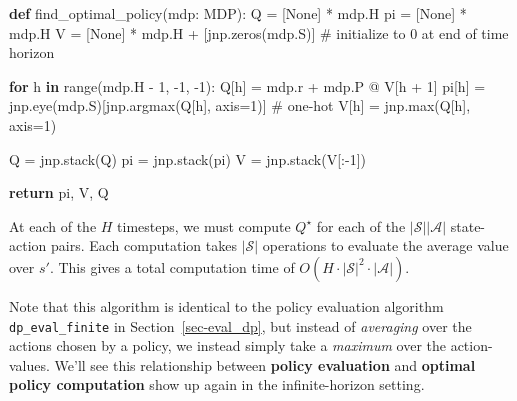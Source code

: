 \documentclass[
  letterpaper,
  DIV=11,
  numbers=noendperiod]{scrreprt}
\newenvironment{Shaded}{\begin{snugshade}}{\end{snugshade}}
\newcommand{\BuiltInTok}[1]{\textcolor[rgb]{0.00,0.23,0.31}{#1}}
\newcommand{\CommentTok}[1]{\textcolor[rgb]{0.37,0.37,0.37}{#1}}
\newcommand{\ControlFlowTok}[1]{\textcolor[rgb]{0.00,0.23,0.31}{\textbf{#1}}}
\newcommand{\DecValTok}[1]{\textcolor[rgb]{0.68,0.00,0.00}{#1}}
\newcommand{\KeywordTok}[1]{\textcolor[rgb]{0.00,0.23,0.31}{\textbf{#1}}}
\newcommand{\NormalTok}[1]{\textcolor[rgb]{0.00,0.23,0.31}{#1}}
\newcommand{\OperatorTok}[1]{\textcolor[rgb]{0.37,0.37,0.37}{#1}}
\newcommand{\VariableTok}[1]{\textcolor[rgb]{0.07,0.07,0.07}{#1}}
\theoremstyle{plain}
\theoremstyle{plain}
\theoremstyle{definition}
\theoremstyle{definition}
\theoremstyle{remark}
\begin{document}
\begin{Shaded}
\begin{Highlighting}[]
\KeywordTok{def}\NormalTok{ find\_optimal\_policy(mdp: MDP):}
\NormalTok{    Q }\OperatorTok{=}\NormalTok{ [}\VariableTok{None}\NormalTok{] }\OperatorTok{*}\NormalTok{ mdp.H}
\NormalTok{    pi }\OperatorTok{=}\NormalTok{ [}\VariableTok{None}\NormalTok{] }\OperatorTok{*}\NormalTok{ mdp.H}
\NormalTok{    V }\OperatorTok{=}\NormalTok{ [}\VariableTok{None}\NormalTok{] }\OperatorTok{*}\NormalTok{ mdp.H }\OperatorTok{+}\NormalTok{ [jnp.zeros(mdp.S)]  }\CommentTok{\# initialize to 0 at end of time horizon}

    \ControlFlowTok{for}\NormalTok{ h }\KeywordTok{in} \BuiltInTok{range}\NormalTok{(mdp.H }\OperatorTok{{-}} \DecValTok{1}\NormalTok{, }\OperatorTok{{-}}\DecValTok{1}\NormalTok{, }\OperatorTok{{-}}\DecValTok{1}\NormalTok{):}
\NormalTok{        Q[h] }\OperatorTok{=}\NormalTok{ mdp.r }\OperatorTok{+}\NormalTok{ mdp.P }\OperatorTok{@}\NormalTok{ V[h }\OperatorTok{+} \DecValTok{1}\NormalTok{]}
\NormalTok{        pi[h] }\OperatorTok{=}\NormalTok{ jnp.eye(mdp.S)[jnp.argmax(Q[h], axis}\OperatorTok{=}\DecValTok{1}\NormalTok{)]  }\CommentTok{\# one{-}hot}
\NormalTok{        V[h] }\OperatorTok{=}\NormalTok{ jnp.}\BuiltInTok{max}\NormalTok{(Q[h], axis}\OperatorTok{=}\DecValTok{1}\NormalTok{)}

\NormalTok{    Q }\OperatorTok{=}\NormalTok{ jnp.stack(Q)}
\NormalTok{    pi }\OperatorTok{=}\NormalTok{ jnp.stack(pi)}
\NormalTok{    V }\OperatorTok{=}\NormalTok{ jnp.stack(V[:}\OperatorTok{{-}}\DecValTok{1}\NormalTok{])}

    \ControlFlowTok{return}\NormalTok{ pi, V, Q}
\end{Highlighting}
\end{Shaded}

At each of the \(H\) timesteps, we must compute \(Q^{\star}\) for each
of the \(|\mathcal{S}| |\mathcal{A}|\) state-action pairs. Each
computation takes \(|\mathcal{S}|\) operations to evaluate the average
value over \(s'\). This gives a total computation time of
\(O(H \cdot |\mathcal{S}|^2 \cdot |\mathcal{A}|)\).

Note that this algorithm is identical to the policy evaluation algorithm
\texttt{dp\_eval\_finite} in Section~\ref{sec-eval_dp}, but instead of
\emph{averaging} over the actions chosen by a policy, we instead simply
take a \emph{maximum} over the action-values. We'll see this
relationship between \textbf{policy evaluation} and \textbf{optimal
policy computation} show up again in the infinite-horizon setting.
\end{document}
